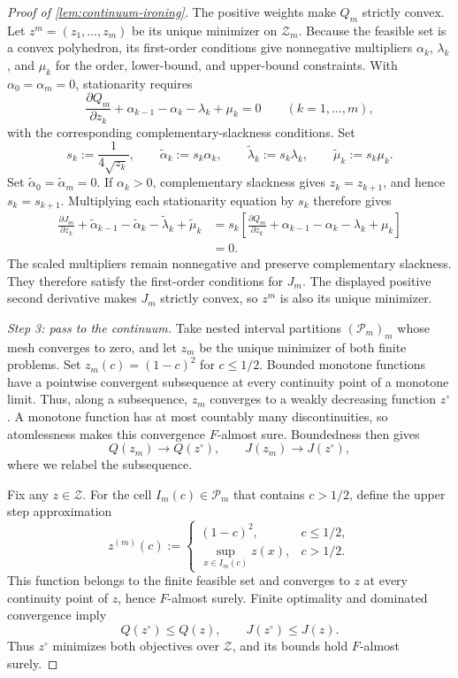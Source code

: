 \documentclass[12pt,reqno]{article}
\theoremstyle{definition} \newtheorem{example}{Example}
\theoremstyle{definition} \newtheorem{condition}{Condition}
\theoremstyle{definition} \newtheorem{corollary}{Corollary}
\theoremstyle{definition} \newtheorem{claim}{Claim}
\theoremstyle{definition} \newtheorem{definition}{Definition}
\theoremstyle{definition} \newtheorem{conjecture}{Conjecture}
\theoremstyle{definition} \newtheorem{Lemma}{Lemma}
\theoremstyle{definition} \newtheorem{lemma}{Lemma}
\theoremstyle{plain} \newtheorem{theorem}{Theorem}
\theoremstyle{definition} \newtheorem{assumption}{Assumption}
\theoremstyle{definition} \newtheorem*{assumptionnonumber}{Assumption}
\theoremstyle{definition} \newtheorem*{theoremNoNumber}{Proposition}
\theoremstyle{definition}\newtheorem{proposition}{Proposition}
\theoremstyle{definition} \newtheorem{observation}{Observation}
\theoremstyle{definition} \newtheorem*{definitionNoNumber}{Definition}
\theoremstyle{definition} \newtheorem{Definition}{Definition}
\theoremstyle{definition} \newtheorem*{DefinitionNoNumber}{Definition}
\theoremstyle{definition} \newtheorem*{fact}{Fact}
\theoremstyle{definition} \newtheorem*{property}{Property}
\theoremstyle{definition} \newtheorem{remark}{Remark}
\theoremstyle{definition}\newtheorem{romanexampleinner}{Example}
\begin{document}
\begin{proof}[Proof of \cref{lem:continuum-ironing}]
The positive weights make \(Q_m\) strictly convex. Let \(z^m=(z_1,\ldots,z_m)\) be its unique minimizer on \(\mathcal Z_m\). Because the feasible set is a convex polyhedron, its first-order conditions give nonnegative multipliers \(\alpha_k\), \(\lambda_k\), and \(\mu_k\) for the order, lower-bound, and upper-bound constraints. With \(\alpha_0=\alpha_m=0\), stationarity requires
\[
\frac{\partial Q_m}{\partial z_k}
+\alpha_{k-1}-\alpha_k-\lambda_k+\mu_k
=0
\qquad(k=1,\ldots,m),
\]
with the corresponding complementary-slackness conditions. Set
\[
s_k:=\frac{1}{4\sqrt{z_k}},
\qquad
\widetilde\alpha_k:=s_k\alpha_k,
\qquad
\widetilde\lambda_k:=s_k\lambda_k,
\qquad
\widetilde\mu_k:=s_k\mu_k.
\]
Set \(\widetilde\alpha_0=\widetilde\alpha_m=0\). 
If \(\alpha_k>0\), complementary slackness gives \(z_k=z_{k+1}\), and hence \(s_k=s_{k+1}\). Multiplying each stationarity equation by \(s_k\) therefore gives
\begin{align*}
\frac{\partial J_m}{\partial z_k}
+\widetilde\alpha_{k-1}-\widetilde\alpha_k
-\widetilde\lambda_k+\widetilde\mu_k
&=
s_k\left[
\frac{\partial Q_m}{\partial z_k}
+\alpha_{k-1}-\alpha_k-\lambda_k+\mu_k
\right]\\
&=0.
\end{align*}
The scaled multipliers remain nonnegative and preserve complementary slackness. They therefore satisfy the first-order conditions for \(J_m\). The displayed positive second derivative makes \(J_m\) strictly convex, so \(z^m\) is also its unique minimizer.

\emph{Step 3: pass to the continuum.}
Take nested interval partitions \((\mathcal P_m)_m\) whose mesh converges to zero, and let \(z_m\) be the unique minimizer of both finite problems. Set \(z_m(c)=(1-c)^2\) for \(c\leq1/2\). Bounded monotone functions have a pointwise convergent subsequence at every continuity point of a monotone limit. Thus, along a subsequence, \(z_m\) converges to a weakly decreasing function \(z^\circ\). A monotone function has at most countably many discontinuities, so atomlessness makes this convergence \(F\)-almost sure. Boundedness then gives
\[
Q(z_m)\longrightarrow Q(z^\circ),
\qquad
J(z_m)\longrightarrow J(z^\circ),
\]
where we relabel the subsequence.

Fix any \(z\in\mathcal Z\). For the cell \(I_m(c)\in\mathcal P_m\) that contains \(c>1/2\), define the upper step approximation
\[
z^{(m)}(c)
:=
\begin{cases}
(1-c)^2,&c\leq1/2,\\[3pt]
\displaystyle\sup_{x\in I_m(c)}z(x),&c>1/2.
\end{cases}
\]
This function belongs to the finite feasible set and converges to \(z\) at every continuity point of \(z\), hence \(F\)-almost surely. Finite optimality and dominated convergence imply
\[
Q(z^\circ)\leq Q(z),
\qquad
J(z^\circ)\leq J(z).
\]
Thus \(z^\circ\) minimizes both objectives over \(\mathcal Z\), and its bounds hold \(F\)-almost surely.


\end{proof}
\end{document}
